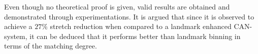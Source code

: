Even though no theoretical proof is given, valid results are
obtained and demonstrated through experimentations. It is argued that since it
is observed to achieve a $27\%$ stretch reduction when compared to a landmark
enhanced CAN-system, it can be deduced that it performs better than landmark
binning in terms of the matching degree.


%
%

%
%

